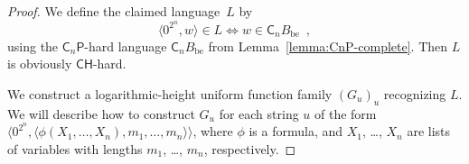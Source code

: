 \documentclass[12pt,a4paper]{article}
\theoremstyle{definition}
\theoremstyle{remark}
\newcommand{\classP}{\mathsf{P}}
\newcommand{\classCH}{\mathsf{CH}}
\newcommand{\quantC}{\mathsf{C}}
\begin{document}
\begin{proof}
We define the claimed language~$L$ by
\begin{equation}
\label{equation: definition of padded CQBF}
 \langle 0^{2^n}, w \rangle \in L
 \iff
 w \in \quantC_n B_{\mathrm{be}} \enspace , 
\end{equation}
using the $\quantC _n \classP$-hard language $\quantC_n B_{\mathrm{be}}$ 
from Lemma~\ref{lemma:CnP-complete}. 
Then $L$ is obviously $\classCH$-hard. 

We construct a logarithmic-height uniform function family $(G_u)_u$
recognizing $L$.
We will describe how to construct $G _u$ 
for each string $u$ of the form $\langle 0^{2^n}, \allowbreak
\langle \phi(X_1, \dots, X_n), m_1, \dots, m_n \rangle \rangle$, 
where 
$\phi$ is a formula, and 
$X _1$, \ldots, $X _n$ are lists of variables
with lengths $m _1$, \ldots, $m _n$, respectively. 
 

\end{proof}
\end{document}
